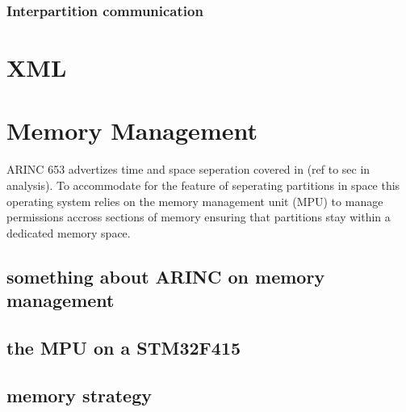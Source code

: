 \subsubsection{Interpartition communication}

\section{XML}


\section{Memory Management}
ARINC 653 advertizes time and space seperation covered in (ref to sec in analysis).
To accommodate for the feature of seperating partitions in space
this operating system relies on the memory management unit (MPU)
to manage permissions accross sections of memory
ensuring that partitions stay within a dedicated memory space.

\subsection{something about ARINC on memory management}

\subsection{the MPU on a STM32F415}

\subsection{memory strategy}
